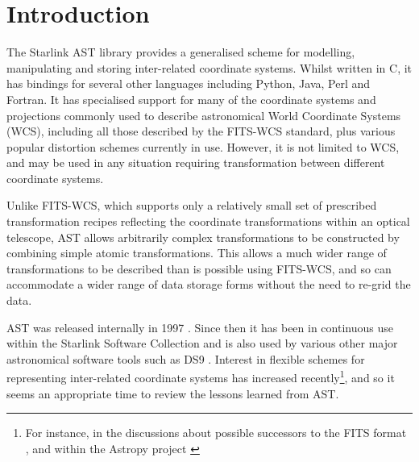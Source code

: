\documentclass[final,authoryear,5p,times,twocolumn]{elsarticle}
\begin{document}

\newcommand{\mnras}{Mon Not R Astron Soc}
\newcommand{\aap}{Astron Astrophys}
\newcommand{\aaps}{Astron Astrophys Supp}
\newcommand{\pasp}{Pub Astron Soc Pacific}
\newcommand{\apj}{Astrophys J}
\newcommand{\apjs}{Astrophys J Supp}
\newcommand{\qjras}{Quart J R Astron Soc}
\newcommand{\an}{Astron.\ Nach.}
\newcommand{\ijimw}{Int.\ J.\ Infrared \& Millimeter Waves}
\newcommand{\procspie}{Proc.\ SPIE}
\newcommand{\aspconf}{ASP Conf. Ser.}

\newcommand{\ascl}[1]{\href{http://www.ascl.net/#1}{ascl:#1}}

\section{Introduction}
\label{sec:intro}

The Starlink AST library \citep[][\ascl{1404.016}]{SUN211} provides a
generalised scheme for modelling, manipulating and storing inter-related
coordinate systems. Whilst written in C, it has bindings for several
other languages including Python, Java, Perl and Fortran. It has
specialised support for many of the coordinate systems and projections
commonly used to describe astronomical World Coordinate Systems (WCS),
including all those described by the FITS-WCS standard, plus various
popular distortion schemes currently in use. However, it is not limited
to WCS, and may be used in any situation requiring transformation between
different coordinate systems.

Unlike FITS-WCS, which supports only a relatively small set of prescribed
transformation recipes reflecting the coordinate transformations within
an optical telescope, AST allows arbitrarily complex transformations to be
constructed by combining simple atomic transformations. This allows a much
wider range of transformations to be
described than is possible using FITS-WCS, and so can accommodate a wider
range of data storage forms without the need to re-grid the data.

AST was released internally in 1997 \cite[][included in ``Twenty Years of
ADASS'' \nocite{adass20}]{1998ASPC..145...41W}. Since then it has been in
continuous use within the Starlink Software Collection \citep[][\ascl{1110.012}]{2014ASPC..485..391C}
and is also used by various other major astronomical software tools such as
DS9 \citep[][\ascl{0003.002}]{2003ASPC..295..489J}. Interest in flexible schemes for representing
inter-related coordinate systems has increased recently\footnote{For
instance, in the discussions about possible successors to the FITS format \citep{2015Mink},
and within the Astropy project \citep{2013A&A...558A..33A}}, and so it seems an appropriate time to
review the lessons learned from AST.
\end{document}
